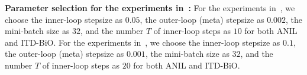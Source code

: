 \documentclass{osudissert96}
\begin{document}

\vspace{0.2cm}
\noindent 
{\bf Parameter selection for the experiments in~:} 
For the experiments in~, we choose the inner-loop stepsize as $0.05$, the outer-loop (meta) stepsize as $0.002$, the  mini-batch size as $32$, and the number $T$ of inner-loop steps as $10$ for both ANIL and  ITD-BiO. For the experiments in~, we choose the inner-loop stepsize as $0.1$, the outer-loop (meta) stepsize as $0.001$, the  mini-batch size as $32$, and the number $T$ of inner-loop steps as $20$ for both ANIL and  ITD-BiO.
\end{document}

